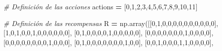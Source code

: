 \documentclass[]{book}
\newenvironment{Shaded}{\begin{snugshade}}{\end{snugshade}}
\newcommand{\CommentTok}[1]{\textcolor[rgb]{0.56,0.35,0.01}{\textit{#1}}}
\newcommand{\DecValTok}[1]{\textcolor[rgb]{0.00,0.00,0.81}{#1}}
\newcommand{\NormalTok}[1]{#1}
\newcommand{\OperatorTok}[1]{\textcolor[rgb]{0.81,0.36,0.00}{\textbf{#1}}}
\begin{document}
\begin{Shaded}
\begin{Highlighting}[]
\CommentTok{# Definición de las acciones}
\NormalTok{actions }\OperatorTok{=}\NormalTok{ [}\DecValTok{0}\NormalTok{,}\DecValTok{1}\NormalTok{,}\DecValTok{2}\NormalTok{,}\DecValTok{3}\NormalTok{,}\DecValTok{4}\NormalTok{,}\DecValTok{5}\NormalTok{,}\DecValTok{6}\NormalTok{,}\DecValTok{7}\NormalTok{,}\DecValTok{8}\NormalTok{,}\DecValTok{9}\NormalTok{,}\DecValTok{10}\NormalTok{,}\DecValTok{11}\NormalTok{]}

\CommentTok{# Definición de las recompensas}
\NormalTok{R }\OperatorTok{=}\NormalTok{ np.array([[}\DecValTok{0}\NormalTok{,}\DecValTok{1}\NormalTok{,}\DecValTok{0}\NormalTok{,}\DecValTok{0}\NormalTok{,}\DecValTok{0}\NormalTok{,}\DecValTok{0}\NormalTok{,}\DecValTok{0}\NormalTok{,}\DecValTok{0}\NormalTok{,}\DecValTok{0}\NormalTok{,}\DecValTok{0}\NormalTok{,}\DecValTok{0}\NormalTok{,}\DecValTok{0}\NormalTok{],}
\NormalTok{              [}\DecValTok{1}\NormalTok{,}\DecValTok{0}\NormalTok{,}\DecValTok{1}\NormalTok{,}\DecValTok{0}\NormalTok{,}\DecValTok{0}\NormalTok{,}\DecValTok{1}\NormalTok{,}\DecValTok{0}\NormalTok{,}\DecValTok{0}\NormalTok{,}\DecValTok{0}\NormalTok{,}\DecValTok{0}\NormalTok{,}\DecValTok{0}\NormalTok{,}\DecValTok{0}\NormalTok{],}
\NormalTok{              [}\DecValTok{0}\NormalTok{,}\DecValTok{1}\NormalTok{,}\DecValTok{0}\NormalTok{,}\DecValTok{0}\NormalTok{,}\DecValTok{0}\NormalTok{,}\DecValTok{0}\NormalTok{,}\DecValTok{1}\NormalTok{,}\DecValTok{0}\NormalTok{,}\DecValTok{0}\NormalTok{,}\DecValTok{0}\NormalTok{,}\DecValTok{0}\NormalTok{,}\DecValTok{0}\NormalTok{],}
\NormalTok{              [}\DecValTok{0}\NormalTok{,}\DecValTok{0}\NormalTok{,}\DecValTok{0}\NormalTok{,}\DecValTok{0}\NormalTok{,}\DecValTok{0}\NormalTok{,}\DecValTok{0}\NormalTok{,}\DecValTok{0}\NormalTok{,}\DecValTok{1}\NormalTok{,}\DecValTok{0}\NormalTok{,}\DecValTok{0}\NormalTok{,}\DecValTok{0}\NormalTok{,}\DecValTok{0}\NormalTok{],}
\NormalTok{              [}\DecValTok{0}\NormalTok{,}\DecValTok{0}\NormalTok{,}\DecValTok{0}\NormalTok{,}\DecValTok{0}\NormalTok{,}\DecValTok{0}\NormalTok{,}\DecValTok{0}\NormalTok{,}\DecValTok{0}\NormalTok{,}\DecValTok{0}\NormalTok{,}\DecValTok{1}\NormalTok{,}\DecValTok{0}\NormalTok{,}\DecValTok{0}\NormalTok{,}\DecValTok{0}\NormalTok{],}
\NormalTok{              [}\DecValTok{0}\NormalTok{,}\DecValTok{1}\NormalTok{,}\DecValTok{0}\NormalTok{,}\DecValTok{0}\NormalTok{,}\DecValTok{0}\NormalTok{,}\DecValTok{0}\NormalTok{,}\DecValTok{0}\NormalTok{,}\DecValTok{0}\NormalTok{,}\DecValTok{0}\NormalTok{,}\DecValTok{1}\NormalTok{,}\DecValTok{0}\NormalTok{,}\DecValTok{0}\NormalTok{],}
\NormalTok{              [}\DecValTok{0}\NormalTok{,}\DecValTok{0}\NormalTok{,}\DecValTok{1}\NormalTok{,}\DecValTok{0}\NormalTok{,}\DecValTok{0}\NormalTok{,}\DecValTok{0}\NormalTok{,}\DecValTok{1}\NormalTok{,}\DecValTok{1}\NormalTok{,}\DecValTok{0}\NormalTok{,}\DecValTok{0}\NormalTok{,}\DecValTok{0}\NormalTok{,}\DecValTok{0}\NormalTok{],}

\end{Highlighting}
\end{Shaded}
\end{document}
